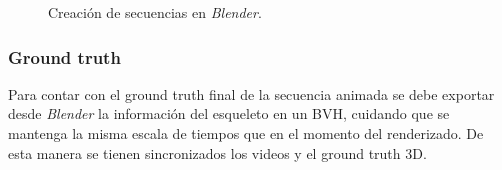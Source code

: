 \begin{figure}[ht!]
   \hspace{0.2cm}
   \caption{Creación de secuencias en \textit{Blender}.}   
 \end{figure} 


 
\subsubsection*{Ground truth} 

Para contar con el ground truth final de la secuencia animada se debe exportar desde \textit{Blender} la información del esqueleto en un BVH, cuidando que se mantenga la misma escala de tiempos que en el momento del renderizado. De esta manera se tienen sincronizados los videos y el ground truth 3D.

